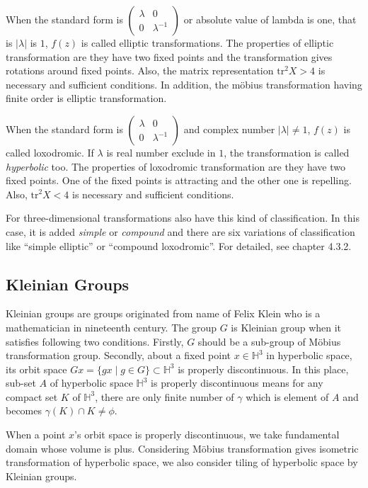 When the standard form is
$\begin{pmatrix}\lambda & 0 \\ 0 & \lambda^{-1} \end{pmatrix}$
or absolute value of lambda is one, that is  $|\lambda|$ is $1$, 
$f(z)$ is called elliptic transformations.
The properties of elliptic transformation are they have
two fixed points and the transformation gives rotations around fixed
points.
Also, the matrix representation $\mathrm{tr}^2X > 4$ is 
necessary and sufficient conditions.
In addition, the m\"obius transformation having finite order
is elliptic transformation.

When the standard form is
$\begin{pmatrix}\lambda & 0 \\ 0 & \lambda^{-1} \end{pmatrix}$
and complex number $|\lambda| \neq 1$, $f(z)$ is called loxodromic.
If $\lambda$ is real number exclude in $1$, the transformation is called
\textit{hyperbolic} too.
The properties of loxodromic transformation are they have two fixed
points. One of the fixed points is attracting and the other one is repelling.
Also, $\mathrm{tr}^2X < 4$ is necessary and sufficient conditions.

For three-dimensional transformations also have this kind of
classification.
In this case, it is added \textit{simple} or \textit{compound} and
there are six variations of classification like ``simple elliptic'' or
``compound loxodromic''.
For detailed, see chapter 4.3.2.

\subsection{Kleinian Groups}

Kleinian groups are groups originated from name of Felix Klein who is
a mathematician in nineteenth century.
The group $G$ is Kleinian group when it satisfies following two
conditions. 
Firstly, $G$ should be a sub-group of M\"obius transformation group.
Secondly, about a fixed point $x\in\mathbb{H}^3$ in hyperbolic space,
its orbit space $Gx = \{ gx \mid g\in G\}\subset \mathbb{H}^3$
is properly discontinuous.
In this place, sub-set $A$ of hyperbolic space $\mathbb{H}^3$
is properly discontinuous means
for any compact set $K$ of $\mathbb{H}^3$,
there are only finite number of $\gamma$ which is element of $A$
and becomes $\gamma (K) \cap K \neq \phi$.

When a point $x$'s orbit space is properly discontinuous, we take
fundamental domain whose volume is plus.
Considering M\"obius transformation gives isometric transformation of
hyperbolic space, we also consider tiling of hyperbolic space by
Kleinian groups. 

